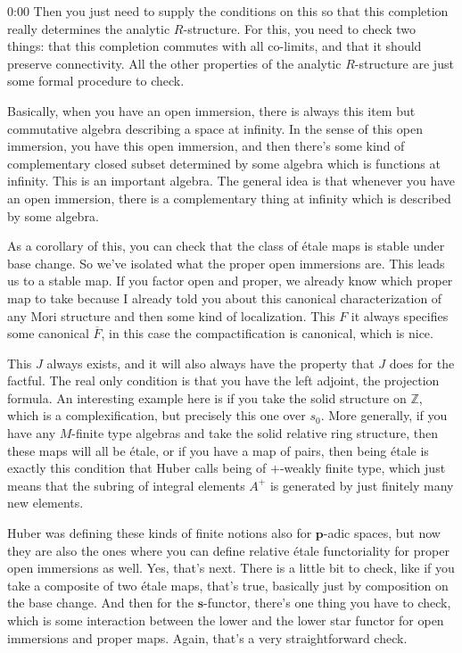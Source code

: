 \begin{unfinished}{0:00}
Then you just need to supply the conditions on this so that this completion really determines the analytic $R$-structure. For this, you need to check two things: that this completion commutes with all co-limits, and that it should preserve connectivity. All the other properties of the analytic $R$-structure are just some formal procedure to check.

Basically, when you have an open immersion, there is always this item but commutative algebra describing a space at infinity. In the sense of this open immersion, you have this open immersion, and then there's some kind of complementary closed subset determined by some algebra which is functions at infinity. This is an important algebra. The general idea is that whenever you have an open immersion, there is a complementary thing at infinity which is described by some algebra.

As a corollary of this, you can check that the class of étale maps is stable under base change. So we've isolated what the proper open immersions are. This leads us to a stable map. If you factor open and proper, we already know which proper map to take because I already told you about this canonical characterization of any Mori structure and then some kind of localization. This $F$ it always specifies some canonical $\overline{F}$, in this case the compactification is canonical, which is nice.

This $J$ always exists, and it will also always have the property that $J$ does for the factful. The real only condition is that you have the left adjoint, the projection formula. An interesting example here is if you take the solid structure on $\mathbb{Z}$, which is a complexification, but precisely this one over $s_0$. More generally, if you have any $M$-finite type algebras and take the solid relative ring structure, then these maps will all be étale, or if you have a map of pairs, then being étale is exactly this condition that Huber calls being of $+$-weakly finite type, which just means that the subring of integral elements $A^+$ is generated by just finitely many new elements.

Huber was defining these kinds of finite notions also for $\mathbf{p}$-adic spaces, but now they are also the ones where you can define relative étale functoriality for proper open immersions as well. Yes, that's next. There is a little bit to check, like if you take a composite of two étale maps, that's true, basically just by composition on the base change. And then for the $\mathbf{s}$-functor, there's one thing you have to check, which is some interaction between the lower and the lower star functor for open immersions and proper maps. Again, that's a very straightforward check.


\end{unfinished}
